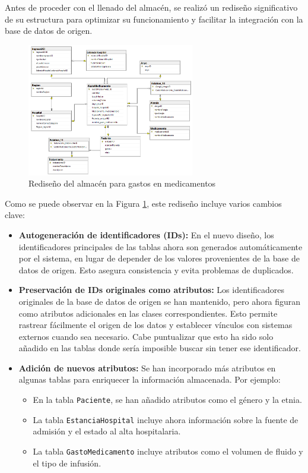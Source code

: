 \documentclass{article}
\begin{document}
	Antes de proceder con el llenado del almacén, se realizó un rediseño significativo de su estructura para optimizar su funcionamiento y facilitar la integración con la base de datos de origen. 
	\begin{figure}[H]
		\begin{center} 
			\includegraphics[width=0.65\textwidth]{images/nuevo_diseno.png} %
			\caption{Rediseño del almacén para gastos en medicamentos}
			\label{fig:nuevo_diseño}
		\end{center}
	\end{figure}
	Como se puede observar en la Figura \ref{fig:nuevo_diseño}, este rediseño incluye varios cambios clave:
	
	\begin{itemize}
		\item \textbf{Autogeneración de identificadores (IDs):} En el nuevo diseño, los identificadores principales de las tablas ahora son generados automáticamente por el sistema, en lugar de depender de los valores provenientes de la base de datos de origen. Esto asegura consistencia y evita problemas de duplicados.
		
		\item \textbf{Preservación de IDs originales como atributos:} Los identificadores originales de la base de datos de origen se han mantenido, pero ahora figuran como atributos adicionales en las clases correspondientes. Esto permite rastrear fácilmente el origen de los datos y establecer vínculos con sistemas externos cuando sea necesario. Cabe puntualizar que esto ha sido solo añadido en las tablas donde sería imposible buscar sin tener ese identificador.
		
		\item \textbf{Adición de nuevos atributos:} Se han incorporado más atributos en algunas tablas para enriquecer la información almacenada. Por ejemplo:
		\begin{itemize}
			\item En la tabla \texttt{Paciente}, se han añadido atributos como el género y la etnia.
			\item La tabla \texttt{EstanciaHospital} incluye ahora información sobre la fuente de admisión y el estado al alta hospitalaria.
			\item La tabla \texttt{GastoMedicamento} incluye atributos como el volumen de fluido y el tipo de infusión.
		\end{itemize}
	\end{itemize}
	
\end{document}
